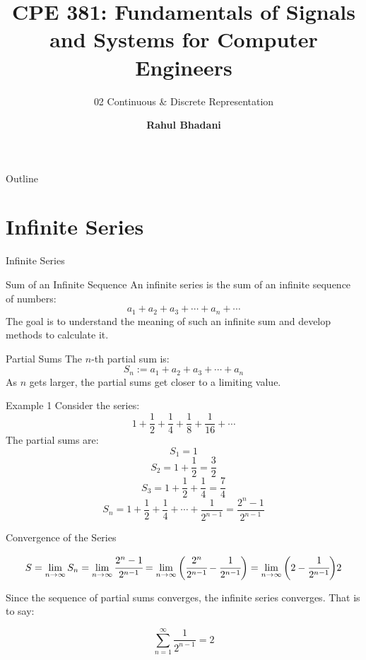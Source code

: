 \documentclass[aspectratio=169,xcolor=dvipsnames,svgnames,x11names,fleqn]{beamer}
\title[CPE 381: Signals and Systems]{CPE 381: Fundamentals of Signals and Systems for Computer Engineers} %
\subtitle{02 Continuous \& Discrete Representation}
\author[Rahul Bhadani] {{\Large \textbf{Rahul Bhadani}}}
\institute[UAH] %
{
    Electrical \& Computer Engineering,  The University of Alabama in Huntsville
}
\date
\begin{document}
\begin{frame}
  \titlepage
\end{frame}

\begin{frame}{Outline}
   \tableofcontents
\end{frame}


\section{Infinite Series}


\begin{frame}{}
    \begin{center}
    \Huge \bf \color{DarkBlue}
    \faFire
    
    Infinite Series
\end{center}
\end{frame}


\begin{frame}{Sum of an Infinite Sequence}
An infinite series is the sum of an infinite sequence of numbers:
$$a_1 + a_2 + a_3 + \cdots + a_n + \cdots$$
The goal is to understand the meaning of such an infinite sum and develop methods to calculate it.
\end{frame}

\begin{frame}{Partial Sums}
The $n$-th partial sum is:
$$S_n := a_1 + a_2 + a_3 + \cdots + a_n$$
As $n$ gets larger, the partial sums get closer to a limiting value.
\end{frame}

\begin{frame}{Example 1}
Consider the series:
$$1 + \frac{1}{2} + \frac{1}{4} + \frac{1}{8} + \frac{1}{16} + \cdots$$
The partial sums are:
$$S_1 = 1$$
$$S_2 = 1 + \frac{1}{2} = \frac{3}{2}$$
$$S_3 = 1 + \frac{1}{2} + \frac{1}{4} = \frac{7}{4}$$
$$S_n = 1 + \frac{1}{2} + \frac{1}{4} + \cdots + \frac{1}{2^{n-1}} =  \frac{2^n - 1}{2^{n-1}}$$
\end{frame}

\begin{frame}{Convergence of the Series}

$$
S = \lim_{n \to \infty} S_n = \lim_{n\to \infty} \cfrac{2^n - 1}{2^{n-1}} =   \lim_{n \to \infty} \bigg (  \cfrac{2^n}{2^{n-1}} - \cfrac{1}{2^{n-1}}\bigg) =  \lim_{n \to \infty} \bigg( 2 - \cfrac{1}{2^{n-1}}\bigg) 2
$$

Since the sequence of partial sums converges, the infinite series converges. That is to say:

$$\sum_{n=1}^{\infty} \frac{1}{2^{n-1}} = 2$$
\end{frame}
\end{document}
